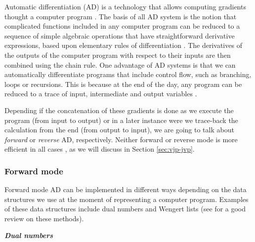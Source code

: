 Automatic differentiation (AD) is a technology that allows computing gradients thought a computer program \cite{griewank2008evaluatingderivatives}. 
The basis of all AD system is the notion that complicated functions included in any computer program can be reduced to a sequence of simple algebraic operations that have straightforward derivative expressions, based upon elementary rules of differentiation \cite{juedes1991taxonomy}.
The derivatives of the outputs of the computer program with respect to their inputs are then combined using the chain rule.
One advantage of AD systems is that we can automatically differentiate programs that include control flow, such as branching, loops or recursions. 
This is because at the end of the day, any program can be reduced to a trace of input, intermediate and output variables \cite{Baydin_Pearlmutter_Radul_Siskind_2015}.

Depending if the concatenation of these gradients is done as we execute the program (from input to output) or in a later instance were we trace-back the calculation from the end (from output to input), we are going to talk about \textit{forward} or \textit{reverse} AD, respectively.
Neither forward or reverse mode is more efficient in all cases \cite{Griewank_1989}, as we will discuss in Section \ref{sec:vjp-jvp}.

\subsubsection{Forward mode}

Forward mode AD can be implemented in different ways depending on the data structures we use at the moment of representing a computer program. Examples of these data structures include dual numbers and Wengert lists (see \cite{Baydin_Pearlmutter_Radul_Siskind_2015} for a good review on these methods). 

\vspace*{10px}
\noindent \textbf{\textit{Dual numbers}}
\vspace*{5px}

